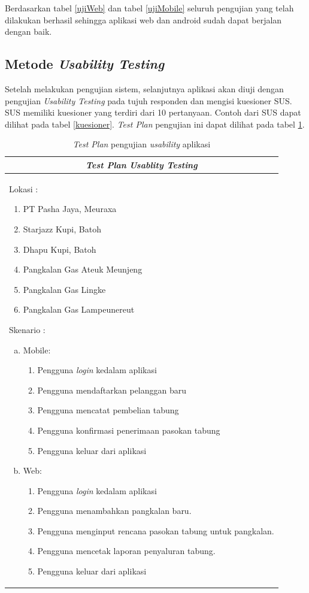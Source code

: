 	Berdasarkan tabel \ref{ujiWeb} dan tabel \ref{ujiMobile} seluruh pengujian yang telah dilakukan berhasil sehingga aplikasi web dan android sudah dapat berjalan dengan baik. 
	
	\subsection{Metode \textit{Usability Testing}}
	
	Setelah melakukan pengujian sistem, selanjutnya aplikasi akan diuji dengan pengujian \textit{Usability Testing} pada tujuh responden dan mengisi kuesioner SUS. SUS memiliki kuesioner yang terdiri dari 10 pertanyaan. Contoh dari SUS dapat dilihat pada tabel \ref{kuesioner}. \textit{Test Plan} pengujian ini dapat dilihat pada tabel \ref{test plan}.
	
		\begin{center}
		\begin{table}[H]
			\center
			\caption{\textit{Test Plan }pengujian \textit{usability} aplikasi}
			\label{test plan}
			\begin{tabular}{ |p{12cm}|  }
				\hline
				\multicolumn{1}{|c|}{\textbf{\textit{Test Plan} \textit{Usablity Testing}}} \\
				\hline
				Lokasi :
				\begin{enumerate}
					\item PT Pasha Jaya, Meuraxa
					\item Starjazz Kupi, Batoh
					\item Dhapu Kupi, Batoh
					\item Pangkalan Gas Ateuk Meunjeng
					\item Pangkalan Gas Lingke
					\item Pangkalan Gas Lampeunereut
				\end{enumerate}
				Skenario :
				\begin{enumerate}[a.]
					\item Mobile:
						\begin{enumerate}[1.]
							\item Pengguna \textit{login} kedalam aplikasi
							\item Pengguna mendaftarkan pelanggan baru
							\item Pengguna mencatat pembelian tabung 
							\item Pengguna konfirmasi penerimaan pasokan tabung
							\item Pengguna keluar dari aplikasi
							
						\end{enumerate}
					\item Web:
						\begin{enumerate}[1.]
							\item Pengguna \textit{login} kedalam aplikasi
							\item Pengguna menambahkan pangkalan baru.
							\item Pengguna menginput rencana pasokan tabung untuk pangkalan.
							\item Pengguna mencetak laporan penyaluran tabung.
							\item Pengguna keluar dari aplikasi
							

\end{enumerate}
\end{enumerate}
\end{tabular}
\end{table}
\end{center}

